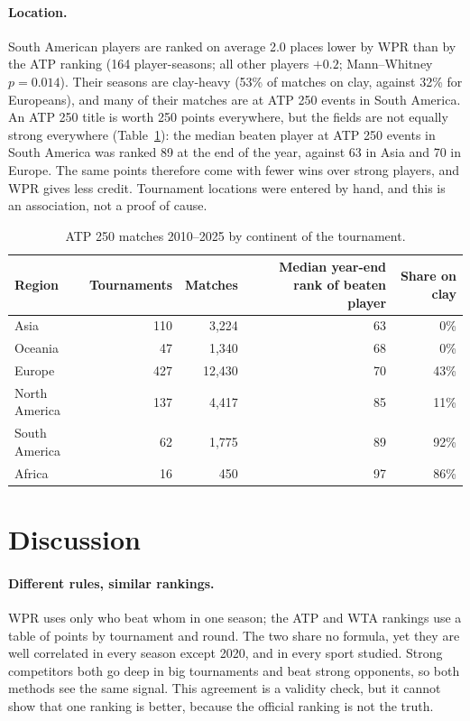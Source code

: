 \documentclass[11pt]{article}
\begin{document}
\paragraph{Location.} South American players are ranked on average 2.0 places lower by WPR than by the ATP ranking (164 player-seasons; all other players $+0.2$; Mann--Whitney $p = 0.014$). Their seasons are clay-heavy (53\% of matches on clay, against 32\% for Europeans), and many of their matches are at ATP 250 events in South America. An ATP 250 title is worth 250 points everywhere, but the fields are not equally strong everywhere (Table~\ref{tab:region}): the median beaten player at ATP 250 events in South America was ranked 89 at the end of the year, against 63 in Asia and 70 in Europe. The same points therefore come with fewer wins over strong players, and WPR gives less credit. Tournament locations were entered by hand, and this is an association, not a proof of cause.

\begin{table}[!htbp]
\centering
\small
\caption{ATP 250 matches 2010--2025 by continent of the tournament.}
\label{tab:region}
\begin{tabular}{@{}lrrrr@{}}
\toprule
Region & Tournaments & Matches & Median year-end rank of beaten player & Share on clay \\
\midrule
Asia & 110 & 3{,}224 & 63 & 0\% \\
Oceania & 47 & 1{,}340 & 68 & 0\% \\
Europe & 427 & 12{,}430 & 70 & 43\% \\
North America & 137 & 4{,}417 & 85 & 11\% \\
South America & 62 & 1{,}775 & 89 & 92\% \\
Africa & 16 & 450 & 97 & 86\% \\
\bottomrule
\end{tabular}
\end{table}

\section{Discussion}

\paragraph{Different rules, similar rankings.} WPR uses only who beat whom in one season; the ATP and WTA rankings use a table of points by tournament and round. The two share no formula, yet they are well correlated in every season except 2020, and in every sport studied. Strong competitors both go deep in big tournaments and beat strong opponents, so both methods see the same signal. This agreement is a validity check, but it cannot show that one ranking is better, because the official ranking is not the truth.
\end{document}
